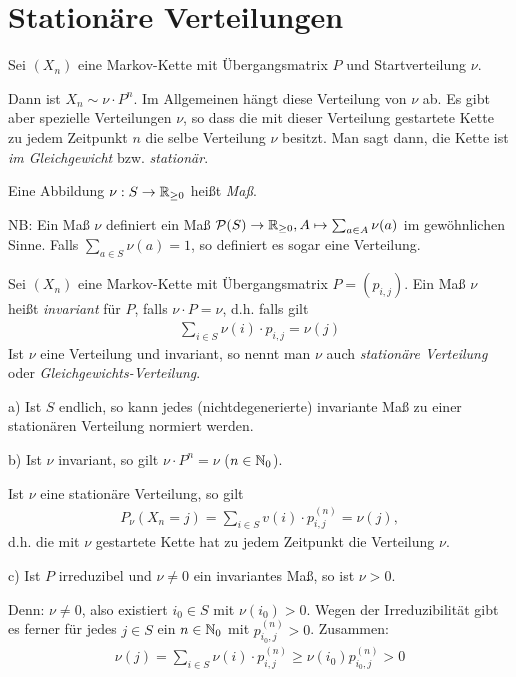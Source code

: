 \documentclass[a4paper,twoside,DIV15,BCOR12mm]{scrbook}
\begin{document}
\section{Stationäre Verteilungen}

Sei $(X_n)$ eine Markov-Kette mit Übergangsmatrix $P$ und Startverteilung $\nu$.

Dann ist $X_n \sim \nu \cdot P^n$. Im Allgemeinen hängt diese Verteilung von $\nu$ ab. Es gibt aber spezielle Verteilungen
$\nu$, so dass die mit dieser Verteilung gestartete Kette zu jedem Zeitpunkt $n$ die selbe Verteilung $\nu$ besitzt. Man sagt dann,
die Kette ist \emph{im Gleichgewicht} bzw. \emph{stationär}.

\begin{definition}
  Eine Abbildung $\nu: S \rightarrow \mathbb{R}_{\geq 0}$ heißt \emph{Maß}.

  NB: Ein Maß $\nu$ definiert ein Maß $\mathcal{P}(S) \rightarrow \mathbb{R}_{\geq 0}, A \mapsto \sum_{a \in A} \nu(a) $ im gewöhnlichen Sinne.
  Falls $\sum_{a \in S} \nu(a) = 1$, so definiert es sogar eine Verteilung.
\end{definition}

\begin{definition}
  Sei $(X_n)$ eine Markov-Kette mit Übergangsmatrix $P = (p_{i,j})$. Ein Maß $\nu$ heißt \emph{invariant} für $P$, falls $\nu \cdot P = \nu$, d.h.
  falls gilt
  \begin{align*}
    \sum_{i \in S} \nu(i) \cdot p_{i,j} = \nu(j)
  \end{align*}
  Ist $\nu$ eine Verteilung und invariant, so nennt man $\nu$ auch \emph{stationäre Verteilung} oder \emph{Gleichgewichts-Verteilung}.
\end{definition}

\begin{bemerkung}
  a) Ist $S$ endlich, so kann jedes (nichtdegenerierte) invariante Maß zu einer stationären Verteilung normiert werden.

  b) Ist $\nu$ invariant, so gilt $\nu \cdot P^n = \nu$ ($n \in \mathbb{N}_0$).

  Ist $\nu$ eine stationäre Verteilung, so gilt
  \begin{align*}
    P_\nu(X_n = j) = \sum_{i \in S} v(i) \cdot p_{i,j}^{(n)} = \nu(j),
  \end{align*}
  d.h. die mit $\nu$ gestartete Kette hat zu jedem Zeitpunkt die Verteilung $\nu$.

  c) Ist $P$ irreduzibel und $\nu \neq 0$ ein invariantes Maß, so ist $\nu > 0$.

  Denn: $\nu \neq 0$, also existiert $i_0 \in S$ mit $\nu(i_0) > 0$.
  Wegen der Irreduzibilität gibt es ferner für jedes $j \in S$ ein $n \in \mathbb{N}_0$ mit $p_{i_0,j}^{(n)} > 0$. Zusammen:
  \begin{align*}
    \nu(j) = \sum_{i \in S} \nu(i) \cdot p_{i,j}^{(n)} \geq \nu(i_0) p_{i_0,j}^{(n)} > 0
  \end{align*}
\end{bemerkung}
\end{document}

